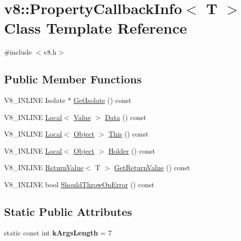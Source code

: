 \hypertarget{classv8_1_1PropertyCallbackInfo}{}\section{v8\+:\+:Property\+Callback\+Info$<$ T $>$ Class Template Reference}
\label{classv8_1_1PropertyCallbackInfo}


{\ttfamily \#include $<$v8.\+h$>$}

\subsection*{Public Member Functions}
\begin{DoxyCompactItemize}
\item 
V8\+\_\+\+I\+N\+L\+I\+NE Isolate $\ast$ \mbox{\hyperlink{classv8_1_1PropertyCallbackInfo_aff7b838ede308ab8a42890962eb9271c}{Get\+Isolate}} () const
\item 
V8\+\_\+\+I\+N\+L\+I\+NE \mbox{\hyperlink{classv8_1_1Local}{Local}}$<$ \mbox{\hyperlink{classv8_1_1Value}{Value}} $>$ \mbox{\hyperlink{classv8_1_1PropertyCallbackInfo_a0156bad4329132beddee04f2d000c617}{Data}} () const
\item 
V8\+\_\+\+I\+N\+L\+I\+NE \mbox{\hyperlink{classv8_1_1Local}{Local}}$<$ \mbox{\hyperlink{classv8_1_1Object}{Object}} $>$ \mbox{\hyperlink{classv8_1_1PropertyCallbackInfo_af46300339d2f31d8dc84a06d74ed6c3c}{This}} () const
\item 
V8\+\_\+\+I\+N\+L\+I\+NE \mbox{\hyperlink{classv8_1_1Local}{Local}}$<$ \mbox{\hyperlink{classv8_1_1Object}{Object}} $>$ \mbox{\hyperlink{classv8_1_1PropertyCallbackInfo_a66b7ec267f18bd84e8baf0a0e16187b9}{Holder}} () const
\item 
V8\+\_\+\+I\+N\+L\+I\+NE \mbox{\hyperlink{classv8_1_1ReturnValue}{Return\+Value}}$<$ T $>$ \mbox{\hyperlink{classv8_1_1PropertyCallbackInfo_aa0882946929c3c4df6d131fe0d8d6746}{Get\+Return\+Value}} () const
\item 
V8\+\_\+\+I\+N\+L\+I\+NE bool \mbox{\hyperlink{classv8_1_1PropertyCallbackInfo_a82d79a9cdaac9807a0fa17331b159ce9}{Should\+Throw\+On\+Error}} () const
\end{DoxyCompactItemize}
\subsection*{Static Public Attributes}
\begin{DoxyCompactItemize}
\item 
\mbox{\label{classv8_1_1PropertyCallbackInfo_a9fc9663a2e23f9324fe61f92d1e7e5b5}} 
static const int {\bfseries k\+Args\+Length} = 7
\end{DoxyCompactItemize}
